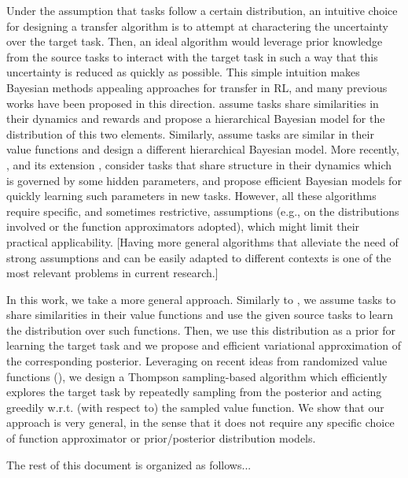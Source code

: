 \documentclass{article}
\begin{document}
Under the assumption that tasks follow a certain distribution, an intuitive choice for designing a transfer algorithm is to attempt at charactering the uncertainty over the target task. Then, an ideal algorithm would leverage prior knowledge from the source tasks to interact with the target task in such a way that this uncertainty is reduced as quickly as possible. This simple intuition makes Bayesian  methods appealing approaches for transfer in RL, and many previous works have been proposed in this direction. \cite{} assume tasks share similarities in their dynamics and rewards and propose a hierarchical Bayesian model for the distribution of this two elements. Similarly, \cite{} assume tasks are similar in their value functions and design a different hierarchical Bayesian model. More recently, \cite{}, and its extension \cite{}, consider tasks that share structure in their dynamics which is governed by some hidden parameters, and propose efficient Bayesian models for quickly learning such parameters in new tasks. However, all these algorithms require specific, and sometimes restrictive, assumptions (e.g., on the distributions involved or the function approximators adopted), which might limit their practical applicability. [Having more general algorithms that alleviate the need of strong assumptions and can be easily adapted to different contexts is one of the most relevant problems in current research.]

In this work, we take a more general approach. Similarly to \cite{}, we assume tasks to share similarities in their value functions and use the given source tasks to learn the distribution over such functions. Then, we use this distribution as a prior for learning the target task and we propose and efficient variational approximation of the corresponding posterior. Leveraging on recent ideas from randomized value functions (\cite{}), we design a Thompson sampling-based algorithm which efficiently explores the target task by repeatedly sampling from the posterior and acting greedily w.r.t. (with respect to) the sampled value function. We show that our approach is very general, in the sense that it does not require any specific choice of function approximator or prior/posterior distribution models. 

The rest of this document is organized as follows... 
\end{document}
